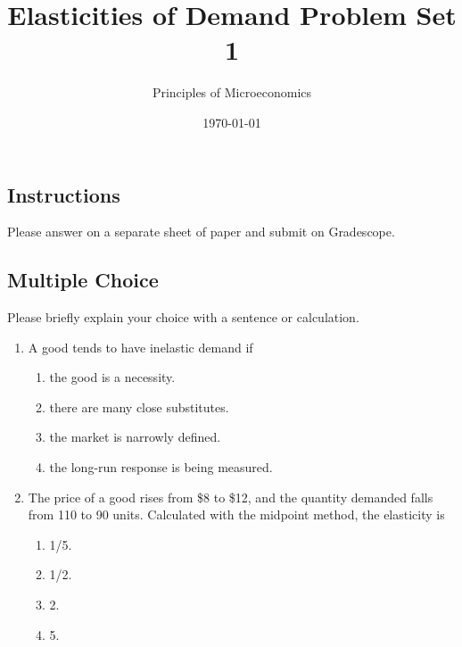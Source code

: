 \documentclass{article}
\title{Elasticities of Demand Problem Set 1}
\author{Principles of Microeconomics}
\date{\today}
\begin{document}
\maketitle

\subsection*{Instructions} Please answer on a separate sheet of paper and submit on Gradescope. 

\subsection*{Multiple Choice} Please briefly explain your choice with a sentence or calculation.

\begin{enumerate}

\item A good tends to have inelastic demand if

	\begin{enumerate}
	
	\item the good is a necessity.
	
	\item there are many close substitutes.
	
	\item the market is narrowly defined.
	
	\item the long-run response is being measured.
	
	\end{enumerate}
	
\item The price of a good rises from \$8 to \$12, and the quantity demanded falls from 110 to 90 units. Calculated with the midpoint method, the elasticity is

	\begin{enumerate}
	
	\item 1/5.
	
	\item 1/2.
	
	\item 2.
	
	\item 5.
	
	\end{enumerate}

\end{enumerate}
\end{document}
